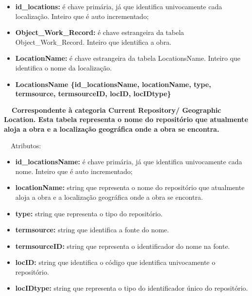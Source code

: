 \documentclass[letterpaper]{article}
\newcommand\textstyleStrongEmphasis[1]{\textbf{#1}}
\newcommand\liststyleLi{%
\renewcommand\labelitemi{{\textbullet}}
\renewcommand\labelitemii{[27A2?]}
\renewcommand\labelitemiii{{\textbullet}}
\renewcommand\labelitemiv{{\textbullet}}
}
\newcommand\liststyleLxiv{%
\renewcommand\labelitemi{[27A2?]}
\renewcommand\labelitemii{[27A2?]}
\renewcommand\labelitemiii{[27A2?]}
\renewcommand\labelitemiv{[27A2?]}
}
\begin{document}
\liststyleLxiv
\begin{itemize}
\item {
\textbf{id\_locations: }\'e chave prim\'aria, j\'a que identifica
univocamente cada localiza\c{c}\~ao. Inteiro que \'e auto
incrementado;}
\item {
\textbf{Object\_Work\_Record:}\textit{ }\'e chave estrangeira da tabela
Object\_Work\_Record. Inteiro que identifica a obra.}
\item {
\textbf{LocationName:} \'e chave estrangeira da tabela LocationsName.
Inteiro que identifica o nome da localiza\c{c}\~ao.}
\end{itemize}

\bigskip

\liststyleLi
\begin{itemize}
\item {\bfseries
LocationsName\textmd{ \{}\textmd{id\_locationsName}\textmd{,
locationName, type, termsource, termsourceID, locID, locIDtype\}}}
\end{itemize}
{\bfseries
\foreignlanguage{english}{\textmd{\ \ Correspondente \`a categoria
}}\textstyleStrongEmphasis{\foreignlanguage{english}{Current
Repository/ Geographic Location}}\foreignlanguage{english}{\textmd{.
Esta
}}\textstyleStrongEmphasis{\foreignlanguage{english}{\textmd{tabela}}}\foreignlanguage{english}{\textmd{
representa o nome do reposit\'orio que atualmente aloja a obra e a
localiza\c{c}\~ao geogr\'afica onde a obra se encontra.}}}


\bigskip

{
\ \ Atributos:}

\liststyleLxiv
\begin{itemize}
\item {
\textbf{id\_locationsName: }\'e chave prim\'aria, j\'a que identifica
univocamente cada nome. Inteiro que \'e auto incrementado;}
\item {
\textbf{locationName: }string que representa o nome do reposit\'orio que
atualmente aloja a obra e a localiza\c{c}\~ao geogr\'afica onde a obra
se encontra.}
\item {
\textbf{type: }string que representa o tipo do reposit\'orio.}
\item {
\textbf{termsource: }string que identifica a fonte do nome.}
\item {
\textbf{termsourceID:} string que representa o identificador do nome na
fonte.}
\item {
\textbf{locID: }string que identifica o c\'odigo que identifica
univocamente o reposit\'orio.}
\item {
\textbf{locIDtype:} string que representa o tipo do identificador
\'unico do reposit\'orio.}
\end{itemize}
\end{document}
